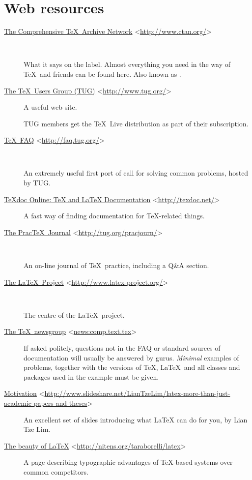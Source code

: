\documentclass[authoryearcitations]{UoYCSproject}
\begin{document}
\section{Web resources}
\label{sec:webresources}

\newcommand{\wwwr}[2]{\item[\href{#1}{#2} \textless\url{#1}\textgreater]}
\begin{description}
  \wwwr{http://www.ctan.org/}{The Comprehensive \TeX\ Archive Network}\
  
  What it says on the label.  Almost everything you need in the way of
  \TeX\ and friends can be found here.  Also known as \CTAN.

\wwwr{http://www.tug.org/}{The \TeX\ Users Group (TUG)} A useful web
  site.
  
  TUG members get the \TeX~Live distribution as part of their
  subscription.

\wwwr{http://faq.tug.org/}{\TeX~FAQ}\

  An extremely useful first port of call for solving common problems,
  hosted by TUG.

\wwwr{http://texdoc.net/}{TeXdoc Online: TeX and LaTeX Documentation}
A fast way of finding documentation for \TeX-related things.

\wwwr{http://tug.org/pracjourn/}{The Prac\TeX\ Journal}\

  An on-line journal of \TeX\ practice, including a Q\&A section.

\wwwr{http://www.latex-project.org/}{The \LaTeX\ Project}\

  The centre of the \LaTeX\ project.
  
\wwwr{news:comp.text.tex}{The \TeX\ newsgroup}
  
  If asked politely, questions not in the FAQ or standard sources of
  documentation will usually be answered by gurus.  \emph{Minimal}
  examples of problems, together with the versions of \TeX, \LaTeX\ 
  and all classes and packages used in the example must be given.

\wwwr{http://www.slideshare.net/LianTzeLim/latex-more-than-just-academic-papers-and-theses}{Motivation}

An excellent set of slides introducing what \LaTeX{} can do for you,
by Lian Tze Lim.

\wwwr{http://nitens.org/taraborelli/latex}{The beauty of \LaTeX{}}

  A page describing typographic advantages of \TeX-based systems over
  common competitors.


\end{description}
\end{document}
